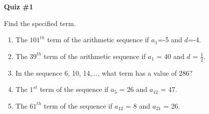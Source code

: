 \begin{center}
\textbf{Quiz \#1}
\end{center} 

\vspce 

Find the specified term.   
\begin{enumerate}
\item The $101^{th}$ term of the arithmetic sequence if $a_{1}$=-5 and $d$=-4.
\item The $39^{th}$ term of the arithmetic sequence if $a_{1}$ = 40 and $d$ = $\frac{1}{2}$.
\item  In the sequence 6, 10, 14,..., what term has a value of 286?
\item The $1^{st}$ term of the sequence if  $a_{5}$ = 26 and $a_{12}$ = 47.
\item The $61^{th}$ term of the sequence if  $a_{12}$ = 8 and $a_{21}$ = 26.
\end{enumerate}